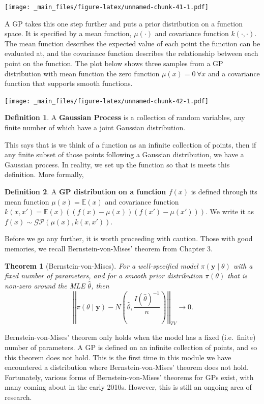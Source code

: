 \documentclass[
]{book}
\newtheorem{theorem}{Theorem}[chapter]
\theoremstyle{definition}
\newtheorem{definition}{Definition}[chapter]
\theoremstyle{definition}
\theoremstyle{definition}
\theoremstyle{definition}
\theoremstyle{remark}
\begin{document}
\texttt{[image: \_main\_files/figure-latex/unnamed-chunk-41-1.pdf]}

A GP takes this one step further and puts a prior distribution on a function space. It is specified by a mean function, \(\mu(\cdot)\) and covariance function \(k(\cdot, \cdot)\). The mean function describes the expected value of each point the function can be evaluated at, and the covariance function describes the relationship between each point on the function. The plot below shows three samples from a GP distribution with mean function the zero function \(\mu(x) = 0\, \forall x\) and a covariance function that supports smooth functions.

\texttt{[image: \_main\_files/figure-latex/unnamed-chunk-42-1.pdf]}

\begin{definition}
A \textbf{Gaussian Process} is a collection of random variables, any finite number of which have a joint Gaussian distribution.
\end{definition}

This says that is we think of a function as an infinite collection of points, then if any finite subset of those points following a Gaussian distribution, we have a Gaussian process. In reality, we set up the function so that is meets this definition. More formally,

\begin{definition}
A \textbf{GP distribution on a function \(f(x)\)} is defined through its mean function \(\mu(x) = \mathbb{E}(x)\) and covariance function \(k(x, x') = \mathbb{E}(x)\left((f(x) - \mu(x))(f(x') - \mu(x'))\right)\). We write it as \(f(x) \sim \mathcal{GP}(\mu(x), k(x, x'))\).
\end{definition}

Before we go any further, it is worth proceeding with caution. Those with good memories, we recall Bernstein-von-Mises' theorem from Chapter 3.

\begin{theorem}[Bernstein-von-Mises]
For a well-specified model \(\pi(\boldsymbol{y} \mid \theta)\) with a fixed number of parameters, and for a smooth prior distribution \(\pi(\theta)\) that is non-zero around the MLE \(\hat{\theta}\), then
\[
\left|\left| \pi(\theta \mid \boldsymbol{y}) - N\left(\hat{\theta}, \frac{I(\hat{\theta})^{-1}}{n}\right) \right|\right|_{TV} \rightarrow 0.
\]
\end{theorem}

Bernstein-von-Mises' theorem only holds when the model has a fixed (i.e.~finite) number of parameters. A GP is defined on an infinite collection of points, and so this theorem does not hold. This is the first time in this module we have encountered a distribution where Bernstein-von-Mises' theorem does not hold. Fortunately, various forms of Bernstein-von-Mises' theorems for GPs exist, with many coming about in the early 2010s. However, this is still an ongoing area of research.
\end{document}
